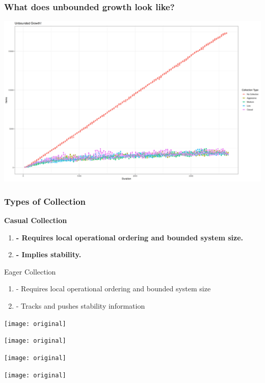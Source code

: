 \documentclass{beamer}
\begin{document}
    \begin{frame}[shrink]
        \frametitle{What does unbounded growth look like?}
        \includegraphics[width=\textwidth]{Unbounded}
    \end{frame}

    \begin{frame}
        \frametitle{Types of Collection}

        \textbf{Casual Collection}
        \begin{enumerate}
            \item \textbf{- Requires local operational ordering and bounded
                system size.}
            \item \textbf{- Implies stability.}
        \end{enumerate}

        Eager Collection
        \begin{enumerate}
            \item - Requires local operational ordering and bounded
                system size
            \item - Tracks and pushes stability information
        \end{enumerate}
    \end{frame}

    \begin{frame}
        \texttt{[image: original]}
    \end{frame}
    \begin{frame}
        \texttt{[image: original]}
    \end{frame}
    \begin{frame}
        \texttt{[image: original]}
    \end{frame}
    \begin{frame}
        \texttt{[image: original]}
    \end{frame}
\end{document}
